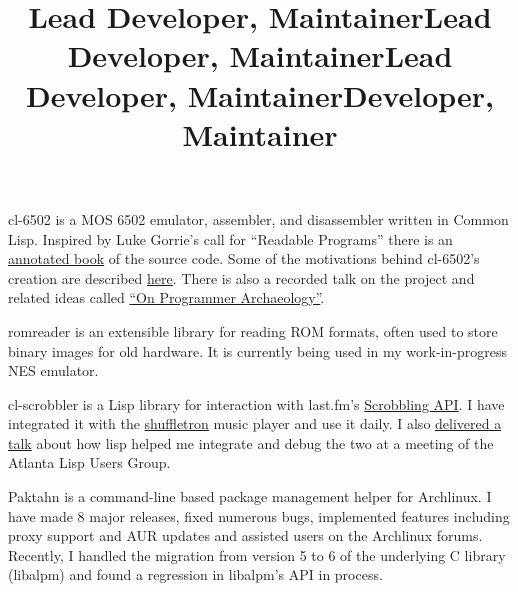 \documentclass[margintitle,line]{res}
\begin{document}
\begin{resume}
\title{Lead Developer, Maintainer}
\begin{position}
  cl-6502 is a MOS 6502 emulator, assembler, and disassembler written in
  Common Lisp. Inspired by Luke Gorrie's call for ``Readable Programs'' there
  is an \href{http://redlinernotes.com/docs/cl-6502.pdf}{annotated book} of the
  source code.  Some of the motivations behind cl-6502's creation are described
  \href{http://blog.redlinernotes.com/posts/Towards-Comprehensible-Computing.html}{here}.
  There is also a recorded talk on the project and related ideas called
  \href{http://vimeo.com/redline6561/on-programmer-archaeology}{``On Programmer Archaeology''}.
\end{position}

\title{Lead Developer, Maintainer}
\begin{position}
  romreader is an extensible library for reading ROM formats, often
  used to store binary images for old hardware. It is currently being
  used in my work-in-progress NES emulator.
\end{position}

\title{Lead Developer, Maintainer}
\begin{position}
  cl-scrobbler is a Lisp library for interaction with last.fm's
  \href{http://www.last.fm/api/scrobbling}{Scrobbling API}. I have integrated
  it with the \href{http://vintage-digital.com/hefner/software/shuffletron/}{shuffletron}
  music player and use it daily. I also
  \href{http://redlinernotes.com/docs/talks/cl-mft.html}{delivered a talk}
  about how lisp helped me integrate and debug the two at a meeting of the
  Atlanta Lisp Users Group.
\end{position}

\title{Developer, Maintainer}
\begin{position}
  Paktahn is a command-line based package management helper for Archlinux.
  I have made 8 major releases, fixed numerous bugs, implemented features
  including proxy support and AUR updates and assisted users on the Archlinux
  forums. Recently, I handled the migration from version 5 to 6 of the
  underlying C library (libalpm) and found a regression in libalpm's API in
  process.
\end{position}


\end{resume}
\end{document}
